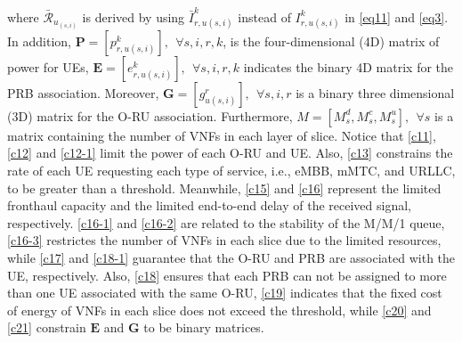 \documentclass[lettersize,journal]{IEEEtran}
\begin{document}
\noindent \noindent where $\bar{\mathcal{R}}_{u_{(s,i)}}$ is derived by using $\bar{I}_{r,u(s,i)}^{k}$ instead of $I_{r,u(s,i)}^{k}$ in  \eqref{eq11} and \eqref{eq3}.
In addition, $\boldsymbol{P} =[p_{r,u(s,i)}^{k}], \:\: \forall s , i, r, k $, is the four-dimensional (4D) matrix of power for UEs, $\boldsymbol{E} =[e_{r,u(s,i)}^k], \:\: \forall s , i, r, k$ indicates the binary 4D matrix for the PRB association. Moreover, $\boldsymbol{G} =[g_{u(s,i)}^r], \:\: \forall s , i, r$ is a binary three dimensional (3D) matrix for the O-RU association. Furthermore, $M = [M_s^d, M_s^c, M_s^u], \:\: \forall s$ is a matrix containing the number of VNFs in each layer of slice. Notice that 
\eqref{c11}, \eqref{c12} and \eqref{c12-1} limit the power of each O-RU and UE.
Also, \eqref{c13} constrains the rate of each UE requesting each type of service, i.e., eMBB, mMTC, and URLLC, to be greater than a threshold. Meanwhile,
\eqref{c15} and \eqref{c16} represent the limited fronthaul capacity and the limited end-to-end delay of the received signal, respectively.
\eqref{c16-1} and \eqref{c16-2} are related to the stability of the M/M/1 queue,
\eqref{c16-3} restrictes the number of VNFs in each slice due to the limited resources, while
\eqref{c17} and \eqref{c18-1} guarantee that the O-RU and PRB are associated with the UE, respectively.
Also, \eqref{c18} ensures that each PRB can not be assigned to more than one UE associated with the same O-RU, \eqref{c19} indicates that the fixed cost of energy of VNFs in each slice does not exceed the threshold, while \eqref{c20} and \eqref{c21} constrain $\boldsymbol{E}$ and $\boldsymbol{G}$ to be binary matrices.
\end{document}
